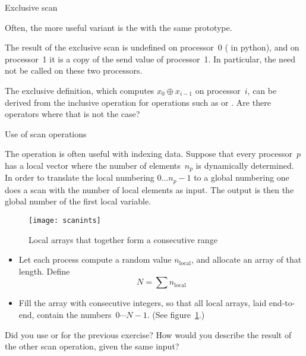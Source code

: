  {Exclusive scan}
\label{sec:mpi-exscan}

Often, the more useful variant is the 
%
%
with the same prototype. 

The result of the exclusive scan is undefined on processor~0
( in python),
and on processor~1 it is a copy of the send value of processor~1.
In particular, the  need not be called on these two 
processors.

\begin{exercise}
  The exclusive definition, which computes $x_0\oplus x_{i-1}$ on
  processor~$i$, can be derived from the inclusive operation
  for operations such as  or
  .  Are there operators where that is not the
  case?
\end{exercise}

 {Use of scan operations}

The  operation is often useful with indexing data. Suppose that
every processor~$p$ has a local vector where the number of elements~$n_p$ is dynamically 
determined. In order to translate the local numbering $0\ldots n_p-1$ to a global numbering
one does a scan with the number of local elements as input. The output is then the global 
number of the first local variable.

\begin{figure}[ht]
  \texttt{[image: scanints]}
  \caption{Local arrays that together form a consecutive range}
  \label{fig:scanints}
\end{figure}

\begin{exercise}
  \label{ex:scanprint}
  \begin{itemize}
  \item Let each process compute a random value $n_{\scriptstyle\mathrm{local}}$,
    and allocate an array of that length.
    Define \[ N=\sum n_{\scriptstyle\mathrm{local}} \]
  \item Fill the array with consecutive integers, so that all local arrays,
    laid end-to-end,
    contain the numbers~$0\cdots N-1$. (See figure~\ref{fig:scanints}.)
  \end{itemize}
\end{exercise}

\begin{exercise}
  Did you use  or  for
  the previous exercise?
  How would you describe the result of the other scan operation, given the
  same input?
\end{exercise}

